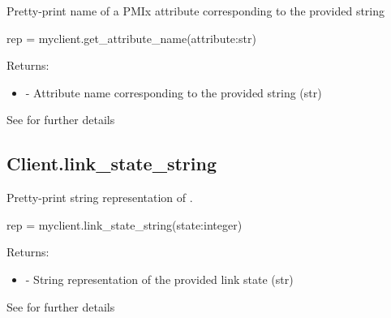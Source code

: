 \summary

Pretty-print name of a \ac{PMIx} attribute corresponding to the provided string

\format

\pyspecificstart
\begin{codepar}
rep = myclient.get_attribute_name(attribute:str)
\end{codepar}
\pyspecificend

\begin{arglist}
\end{arglist}

Returns:
\begin{itemize}
    \item {} - Attribute name corresponding to the provided string (str)
\end{itemize}

See  for further details



\subsection{Client.link_state_string}

\summary

Pretty-print string representation of .

\format

\pyspecificstart
\begin{codepar}
rep = myclient.link_state_string(state:integer)
\end{codepar}
\pyspecificend

\begin{arglist}
\end{arglist}

Returns:
\begin{itemize}
    \item {} - String representation of the provided link state (str)
\end{itemize}

See  for further details




